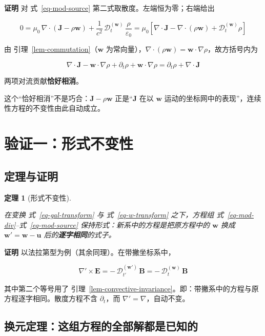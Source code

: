 \documentclass[
  chinese,
  a4paper,
  UTF8,
  12pt,
  oneside,
  openany]{ctexbook}
\theoremstyle{plain}
\newtheorem{theorem}{定理}[chapter]
\theoremstyle{plain}
\theoremstyle{plain}
\theoremstyle{definition}
\theoremstyle{plain}
\theoremstyle{plain}
\theoremstyle{remark}
\begin{document}
\textbf{证明} 对 式~\ref{eq-mod-source}
第二式取散度。左端恒为零；右端给出

\[
0 = \mu_{0}\,\nabla\cdot\left(\mathbf{J}-\rho\mathbf{w}\right) + \frac{1}{c^{2}}\,\mathcal{D}_{t}^{(\mathbf{w})}\,\frac{\rho}{\varepsilon_{0}}
= \mu_{0}\left[\nabla\cdot\mathbf{J} - \nabla\cdot(\rho\mathbf{w}) + \mathcal{D}_{t}^{(\mathbf{w})}\rho\right]
\]

由 引理~\ref{lem-commutation}（\(\mathbf{w}\)
为常向量），\(\nabla\cdot(\rho\mathbf{w}) = \mathbf{w}\cdot\nabla\rho\)，故方括号内为

\[
\nabla\cdot\mathbf{J} - \mathbf{w}\cdot\nabla\rho + \partial_{t}\rho + \mathbf{w}\cdot\nabla\rho
= \partial_{t}\rho + \nabla\cdot\mathbf{J}
\]

两项对流贡献\textbf{恰好相消}。

这个``恰好相消''不是巧合：\(\mathbf{J}-\rho\mathbf{w}\)
正是``\(\mathbf{J}\) 在以 \(\mathbf{w}\)
运动的坐标网中的表现''，连续性方程的不变性由此自动成立。

\section{验证一：形式不变性}\label{sec-gal-covariance}

\subsection{定理与证明}\label{ux5b9aux7406ux4e0eux8bc1ux660e}

\begin{theorem}[形式不变性]\protect\hypertarget{thm-form-invariance}{}\label{thm-form-invariance}

在变换 式~\ref{eq-gal-transform} 与 式~\ref{eq-w-transform} 之下，方程组
式~\ref{eq-mod-div}--式~\ref{eq-mod-source}
保持形式：新系中的方程是把原方程中的 \(\mathbf{w}\) 换成
\(\mathbf{w}' = \mathbf{w}-\mathbf{u}\) 后的\textbf{逐字相同}的式子。

\end{theorem}

\textbf{证明} 以法拉第型为例（其余同理）。在带撇坐标系中，

\[
\nabla'\times\mathbf{E} = -\,\mathcal{D}_{t'}^{(\mathbf{w}')}\,\mathbf{B}
= -\,\mathcal{D}_{t}^{(\mathbf{w})}\,\mathbf{B}
\]

其中第二个等号用了
引理~\ref{lem-convective-invariance}。即：带撇系中的方程与原方程逐字相同。散度方程不含
\(\partial_t\)，而 \(\nabla'=\nabla\)，自动不变。

\subsection{换元定理：这组方程的全部解都是已知的}\label{ux6362ux5143ux5b9aux7406ux8fd9ux7ec4ux65b9ux7a0bux7684ux5168ux90e8ux89e3ux90fdux662fux5df2ux77e5ux7684}
\end{document}
